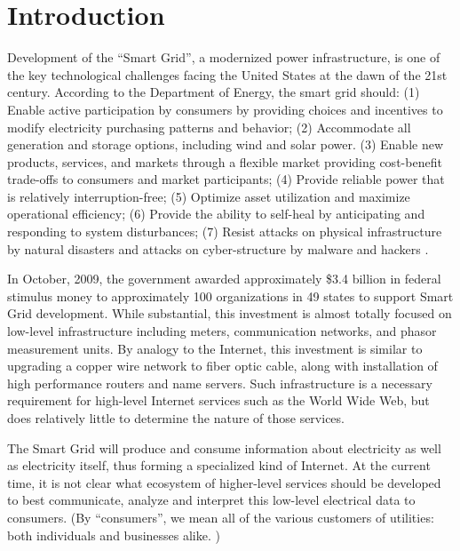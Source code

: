 
\section{Introduction}

Development of the ``Smart Grid'', a modernized power infrastructure, is
one of the key technological challenges facing the United States at the
dawn of the 21st century. According to the Department of Energy, the smart
grid should: (1) Enable active participation by consumers by providing
choices and incentives to modify electricity purchasing patterns and
behavior; (2) Accommodate all generation and storage options, including
wind and solar power.  (3) Enable new products, services, and markets
through a flexible market providing cost-benefit trade-offs to consumers and
market participants; (4) Provide reliable power that is relatively
interruption-free; (5) Optimize asset utilization and maximize operational
efficiency; (6) Provide the ability to self-heal by anticipating and
responding to system disturbances; (7) Resist attacks on physical
infrastructure by natural disasters and attacks on cyber-structure by
malware and hackers \cite{NETL:GridCharacteristics}.

In October, 2009, the government awarded approximately \$3.4 billion in
federal stimulus money to approximately 100 organizations in 49 states to
support Smart Grid development.  While substantial, this investment is
almost totally focused on low-level infrastructure including meters,
communication networks, and phasor measurement units.  By analogy to the
Internet, this investment is similar to upgrading a copper wire network to
fiber optic cable, along with installation of high performance routers and
name servers.  Such infrastructure is a necessary requirement for
high-level Internet services such as the World Wide Web, but does
relatively little to determine the nature of those services.

The Smart Grid will produce and consume information about electricity as
well as electricity itself, thus forming a specialized kind of Internet. At
the current time, it is not clear what ecosystem of higher-level services
should be developed to best communicate, analyze and interpret this
low-level electrical data to consumers.  (By ``consumers'', we mean all of
the various customers of utilities: both individuals and businesses
alike. )

